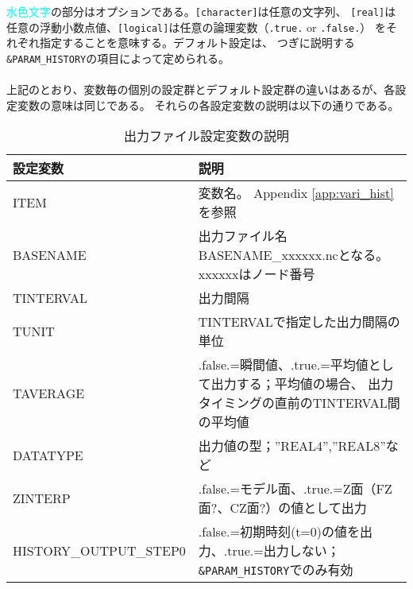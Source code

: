 \textcolor{cyan}{水色文字}の部分はオプションである。\verb|[character]|は任意の文字列、
\verb|[real]|は任意の浮動小数点値、\verb|[logical]|は任意の論理変数（\verb|.true.| or \verb|.false.|）
をそれぞれ指定することを意味する。デフォルト設定は、
つぎに説明する\verb|&PARAM_HISTORY|の項目によって定められる。\\

\\

上記のとおり、変数毎の個別の設定群とデフォルト設定群の違いはあるが、各設定変数の意味は同じである。
それらの各設定変数の説明は以下の通りである。\\

\begin{table}[htb]
\begin{center}
\caption{出力ファイル設定変数の説明}
\begin{tabularx}{150mm}{|l|X|} \hline
 \rowcolor[gray]{0.9} 設定変数 & 説明 \\ \hline
 ITEM                   & 変数名。 Appendix \ref{app:vari_hist}を参照\\ \hline
 BASENAME               & 出力ファイル名 BASENAME\_xxxxxx.ncとなる。xxxxxxはノード番号\\ \hline
 TINTERVAL              & 出力間隔\\ \hline
 TUNIT                  & TINTERVALで指定した出力間隔の単位\\ \hline
 TAVERAGE               & .false.=瞬間値、.true.=平均値として出力する；平均値の場合、
 出力タイミングの直前のTINTERVAL間の平均値\\ \hline
 DATATYPE               & 出力値の型；''REAL4'',''REAL8''など\\ \hline
 ZINTERP                & .false.=モデル面、.true.=Z面（FZ面$?$、CZ面$?$）の値として出力\\ \hline
 HISTORY\_OUTPUT\_STEP0 & .false.=初期時刻(t=0)の値を出力、.true.=出力しない；\verb|&PARAM_HISTORY|でのみ有効\\ \hline
\end{tabularx}
\label{tab:history_settings}
\end{center}
\end{table}

